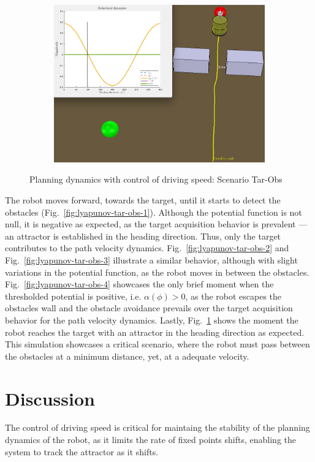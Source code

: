 \begin{figure}[htb!]
\begin{subfigure}{.49\textwidth}
    \includegraphics[width=\textwidth]{img/lyapunov-tar-obs-5.PNG}%
  \caption{}%
  \label{fig:lyapunov-tar-obs-5}
  \end{subfigure}
%
  \caption{Planning dynamics with control of driving speed: Scenario Tar-Obs}%
  \label{fig:lyapunov-tar-obs}
\end{figure}

The robot moves forward, towards the target, until it starts to detect the
obstacles (Fig.~\ref{fig:lyapunov-tar-obs-1}). Although the potential function
is not null, it is negative as expected, as the target acquisition behavior is
prevalent --- an attractor is established in the heading direction. Thus, only
the target contributes to the path velocity
dynamics. Fig.~\ref{fig:lyapunov-tar-obs-2} and
Fig.~\ref{fig:lyapunov-tar-obs-3} illustrate a similar behavior, although with
slight variations in the potential function, as the robot moves in between the
obstacles. Fig.~\ref{fig:lyapunov-tar-obs-4} showcases the only brief moment
when the thresholded potential is positive, i.e. $\alpha(\phi) > 0$, as the
robot escapes the obstacles wall and the obstacle avoidance prevails over the
target acquisition behavior for the path velocity dynamics. Lastly,
Fig.~\ref{fig:lyapunov-tar-obs-5} shows the moment the robot reaches the target
with an attractor in the heading direction as expected. This simulation
showcases a critical scenario, where the robot must pass between the obstacles
at a minimum distance, yet, at a adequate velocity.
%
%
\section{Discussion}%
\label{sec:discussion-lyapunov}
The control of driving speed is critical for maintaing the stability of the
planning dynamics of the robot, as it limits the rate of fixed points shifts,
enabling the system to track the attractor as it shifts.

